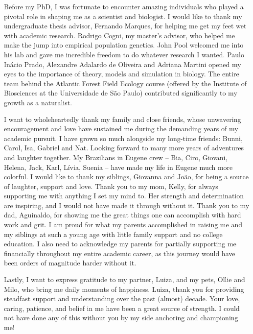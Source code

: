 {Before my PhD, I was fortunate to encounter amazing individuals who played a pivotal role in shaping me as a scientist and biologist.
I would like to thank my undergraduate thesis advisor, Fernando Marques, for helping me get my feet wet with academic research.
Rodrigo Cogni, my master's advisor, who helped me make the jump into empirical population genetics.
John Pool welcomed me into his lab and gave me incredible freedom to do whatever research I wanted.
Paulo Inácio Prado, Alexandre Adalardo de Oliveira and Adriana Martini opened my eyes to the importance of theory, models and simulation in biology.
The entire team behind the Atlantic Forest Field Ecology course (offered by the Institute of Biosciences at the Universidade de São Paulo) contributed significantly to my growth as a naturalist.

I want to wholeheartedly thank my family and close friends,
whose unwavering encouragement and love have sustained me during the demanding years of my academic pursuit.
I have grown so much alongside my long-time friends: Bunni, Carol, Isa, Gabriel and Nat.
Looking forward to many more years of adventures and laughter together.
My Brazilians in Eugene crew -- Bia, Ciro, Giovani, Helena, Jack, Karl, Lívia, Suenia -- have made my life in Eugene much more colorful.
I would like to thank my siblings, Giovanna and João, for being a source of laughter, support and love.
Thank you to my mom, Kelly, for always supporting me with anything I set my mind to.
Her strength and determination are inspiring, and I would not have made it through without it.
Thank you to my dad, Aguinaldo, for showing me the great things one can accomplish with hard work and grit.
I am proud for what my parents accomplished in raising me and my siblings
at such a young age with little family support and no college education.
I also need to acknowledge my parents for partially supporting me financially throughout my entire academic career,
as this journey would have been orders of magnitude harder without it.


Lastly, I want to express gratitude to my partner, Luiza, and my pets, Ollie and Milo, who bring me daily moments of happiness.
Luiza, thank you for providing steadfast support and understanding over the past (almost) decade.
Your love, caring, patience, and belief in me have been a great source of strength.
I could not have done any of this without you by my side anchoring and championing me!


}

